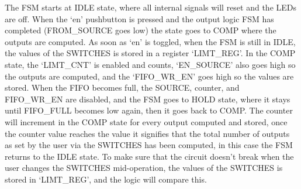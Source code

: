 \documentclass[11pt]{report}
\begin{document}
The FSM starts at IDLE state, where all internal signals will reset and the LEDs are off. When the `en'
pushbutton is pressed and the output logic FSM has completed (FROM\_SOURCE goes low) the state goes to COMP
where the outputs are computed. As soon as `en' is toggled, when the FSM is still in IDLE, the values of the
SWITCHES is stored in a register `LIMT\_REG'. In the COMP state, the `LIMT\_CNT' is enabled and counts,
`EN\_SOURCE' also goes high so the outputs are computed, and the `FIFO\_WR\_EN' goes high so the values are
stored. When the FIFO becomes full, the SOURCE, counter, and FIFO\_WR\_EN are disabled, and the FSM goes to
HOLD state, where it stays until FIFO\_FULL becomes low again, then it goes back to COMP. The counter will
increment in the COMP state for every output computed and stored, once the counter value reaches the value
it signifies that the total number of outputs as set by the user via the SWITCHES has been computed, in this
case the FSM returns to the IDLE state. To make sure that the circuit doesn't break when the user changes the
SWITCHES mid-operation, the values of the SWITCHES is stored in `LIMT\_REG', and the logic will compare this.


\begin{landscape}
    \begin{table}
    \centering
    \caption{SOURCE\_CTRL FSM table of outputs}
    \end{table}
\end{landscape}
\end{document}
